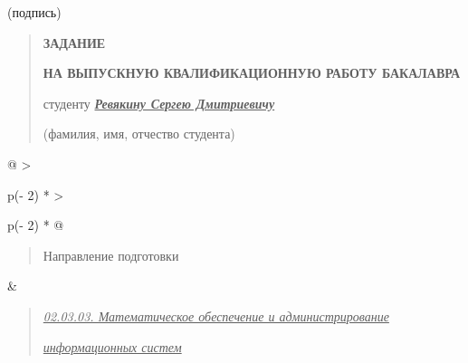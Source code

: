 \documentclass[
]{article}
\begin{document}
(подпись)

\begin{quote}
\textbf{ЗАДАНИЕ}

\textbf{НА ВЫПУСКНУЮ КВАЛИФИКАЦИОННУЮ РАБОТУ БАКАЛАВРА}

студенту \emph{\textbf{\ul{Ревякину Сергею Дмитриевичу}}}

(фамилия, имя, отчество студента)
\end{quote}

\begin{longtable}[]{@{}
  >{\raggedright\arraybackslash}p{(\columnwidth - 2\tabcolsep) * }
  >{\raggedright\arraybackslash}p{(\columnwidth - 2\tabcolsep) * }@{}}
\toprule\noalign{}
\begin{minipage}[b]{\linewidth}\raggedright
\begin{quote}
Направление подготовки
\end{quote}
\end{minipage} & \begin{minipage}[b]{\linewidth}\raggedright
\begin{quote}
\emph{\ul{02.03.03. Математическое обеспечение и администрирование}}

\emph{\ul{информационных систем}}
\end{quote}
\end{minipage} \\
\midrule\noalign{}
\endhead
\bottomrule\noalign{}
\endlastfoot
\end{longtable}
\end{document}
